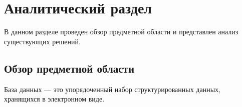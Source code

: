 \chapter{Аналитический раздел}

В данном разделе проведен обзор предметной области и представлен анализ существующих решений.

\section{Обзор предметной области}
База данных\cite{db} --- это упорядоченный набор структурированных данных, хранящихся в электронном виде. 

